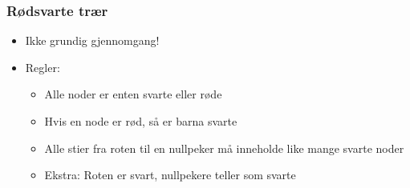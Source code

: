 \documentclass[norsk, handout]{beamer}
\begin{document}
    \begin{frame}
        \frametitle{Rødsvarte trær}
        \begin{itemize}
            \item Ikke grundig gjennomgang!
            \item Regler:
                \begin{itemize}
                    \item Alle noder er enten svarte eller røde
                    \item Hvis en node er rød, så er barna svarte
                    \item Alle stier fra roten til en nullpeker må inneholde like mange
                        svarte noder
                    \item Ekstra: Roten er svart, nullpekere teller som svarte
                \end{itemize}
        \end{itemize}
    \end{frame}
\end{document}
